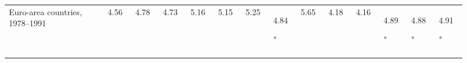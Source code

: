\begin{table}[!htbp]
\begin{threeparttable}
\begin{tabular}{@{}>{\raggedright\arraybackslash}p{0.18\linewidth}*{13}{>{\centering\arraybackslash}p{0.055\linewidth}}@{}}
Euro-area countries, 1978--1991 & \makecell[c]{\rule{0pt}{2.6ex} 4.56 \\ \rule{0pt}{2.0ex} \phantom{\textsuperscript{***}}} & \makecell[c]{\rule{0pt}{2.6ex} 4.78 \\ \rule{0pt}{2.0ex} \phantom{\textsuperscript{***}}} & \makecell[c]{\rule{0pt}{2.6ex} 4.73 \\ \rule{0pt}{2.0ex} \phantom{\textsuperscript{***}}} & \makecell[c]{\rule{0pt}{2.6ex} 5.16 \\ \rule{0pt}{2.0ex} \phantom{\textsuperscript{***}}} & \makecell[c]{\rule{0pt}{2.6ex} 5.15 \\ \rule{0pt}{2.0ex} \phantom{\textsuperscript{***}}} & \makecell[c]{\rule{0pt}{2.6ex} 5.25 \\ \rule{0pt}{2.0ex} \phantom{\textsuperscript{***}}} & \makecell[c]{\rule{0pt}{2.6ex} 4.84 \\ \rule{0pt}{2.0ex} \textsuperscript{*}} & \makecell[c]{\rule{0pt}{2.6ex} 5.65 \\ \rule{0pt}{2.0ex} \phantom{\textsuperscript{***}}} & \makecell[c]{\rule{0pt}{2.6ex} 4.18 \\ \rule{0pt}{2.0ex} \phantom{\textsuperscript{***}}} & \makecell[c]{\rule{0pt}{2.6ex} 4.16 \\ \rule{0pt}{2.0ex} \phantom{\textsuperscript{***}}} & \makecell[c]{\rule{0pt}{2.6ex} 4.89 \\ \rule{0pt}{2.0ex} \textsuperscript{*}} & \makecell[c]{\rule{0pt}{2.6ex} 4.88 \\ \rule{0pt}{2.0ex} \textsuperscript{*}} & \makecell[c]{\rule{0pt}{2.6ex} 4.91 \\ \rule{0pt}{2.0ex} \textsuperscript{*}} \\

\end{tabular}
\end{threeparttable}
\end{table}
